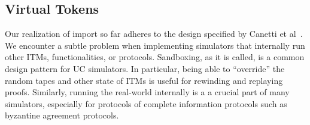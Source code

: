 %
%
%
%
%

\subsection{Virtual Tokens}
Our realization of import so far adheres to the design specified by Canetti et al~\cite{UC}.
We encounter a subtle problem when implementing simulators that internally run other ITMs, functionalities, or protocols.
Sandboxing, as it is called, is a common design pattern for UC simulators. 
In particular, being able to ``override'' the random tapes and other state of ITMs is useful for rewinding and replaying proofs.
Similarly, running the real-world internally is a a crucial part of many simulators, especially for protocols of complete information protocols such as byzantine agreement protocols.

